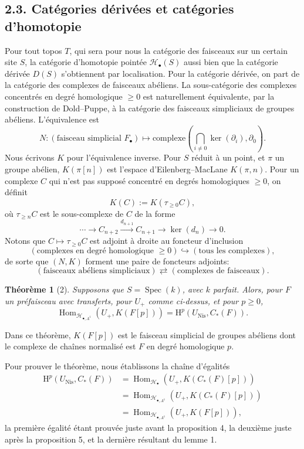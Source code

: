 \documentclass[11pt]{article}
\newcommand{\Nis}{\mathrm{Nis}}
\newcommand{\Spec}{\operatorname{Spec}}
\newcommand{\Hom}{\operatorname{Hom}}
\newcommand{\Hob}{\mathcal H_\bullet}
\newcommand{\HoA}{\mathcal H_{\bullet,A^1}}
\newcommand{\HH}{\mathrm H}
\theoremstyle{deligne}
\newtheorem*{theorem*}{Théorème}
\begin{document}
\subsection*{2.3. Catégories dérivées et catégories d'homotopie}

Pour tout topos \(T\), qui sera pour nous la catégorie des faisceaux sur un certain site \(S\), la catégorie d'homotopie pointée \(\Hob(S)\) aussi bien que la catégorie dérivée \(D(S)\) s'obtiennent par localisation. Pour la catégorie dérivée, on part de la catégorie des complexes de faisceaux abéliens. La sous-catégorie des complexes concentrés en degré homologique \(\ge0\) est naturellement équivalente, par la construction de Dold--Puppe, à la catégorie des faisceaux simpliciaux de groupes abéliens. L'équivalence est
\[
  N:(\text{faisceau simplicial }F_\bullet)
  \longmapsto
  \text{complexe}\left(\bigcap_{i\ne0}\ker(\partial_i),\partial_0\right).
\]
Nous écrivons \(K\) pour l'équivalence inverse. Pour \(S\) réduit à un point, et \(\pi\) un groupe abélien, \(K(\pi[n])\) est l'espace d'Eilenberg--MacLane \(K(\pi,n)\). Pour un complexe \(C\) qui n'est pas supposé concentré en degrés homologiques \(\ge0\), on définit
\[
  K(C):=K(\tau_{\ge0}C),
\]
où \(\tau_{\ge n}C\) est le sous-complexe de \(C\) de la forme
\[
  \cdots \longrightarrow C_{n+2}\xrightarrow{d_{n+1}}C_{n+1}
  \longrightarrow \ker(d_n)\longrightarrow0.
\]
Notons que \(C\mapsto\tau_{\ge0}C\) est adjoint à droite au foncteur d'inclusion
\[
  (\text{complexes en degré homologique }\ge0)
  \hookrightarrow
  (\text{tous les complexes}),
\]
de sorte que \((N,K)\) forment une paire de foncteurs adjoints:
\[
  (\text{faisceaux abéliens simpliciaux})\rightleftarrows(\text{complexes de faisceaux}).
\]

\begin{theorem*}[2]
Supposons que \(S=\Spec(k)\), avec \(k\) parfait. Alors, pour \(F\) un préfaisceau avec transferts, pour \(U_+\) comme ci-dessus, et pour \(p\ge0\),
\[
  \Hom_{\HoA}(U_+,K(F[p]))=\HH^p(U_{\Nis},C_*(F)).
\]
\end{theorem*}

Dans ce théorème, \(K(F[p])\) est le faisceau simplicial de groupes abéliens dont le complexe de chaînes normalisé est \(F\) en degré homologique \(p\).

Pour prouver le théorème, nous établissons la chaîne d'égalités
\[
\begin{aligned}
\HH^p(U_{\Nis},C_*(F))
&=\Hom_{\Hob}(U_+,K(C_*(F)[p])) \\
&=\Hom_{\HoA}(U_+,K(C_*(F)[p])) \\
&=\Hom_{\HoA}(U_+,K(F[p])),
\end{aligned}\tag{1.1}
\]
la première égalité étant prouvée juste avant la proposition 4, la deuxième juste après la proposition 5, et la dernière résultant du lemme 1.
\end{document}
